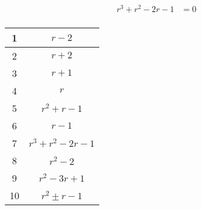 \documentclass{article}
\begin{document}
\begin{align*}
  r^3+r^2-2r-1 &= 0 \\
\end{align*}


\begin{tabular}{|c|c|}
  \hline
  1 & $r-2$ \\ \hline
  2 & $r+2$ \\ \hline
  3 & $r+1$ \\ \hline
  4 & $r$ \\ \hline
  5 & $r^2+r-1$ \\ \hline
  6 & $r-1$ \\ \hline
  7 & $r^3+r^2-2r-1$ \\ \hline
  8 & $r^2-2$ \\ \hline
  9 & $r^2-3r+1$ \\ \hline
  10 & $r^2 \pm r-1$ \\ \hline
\end{tabular}
  
\end{document}
